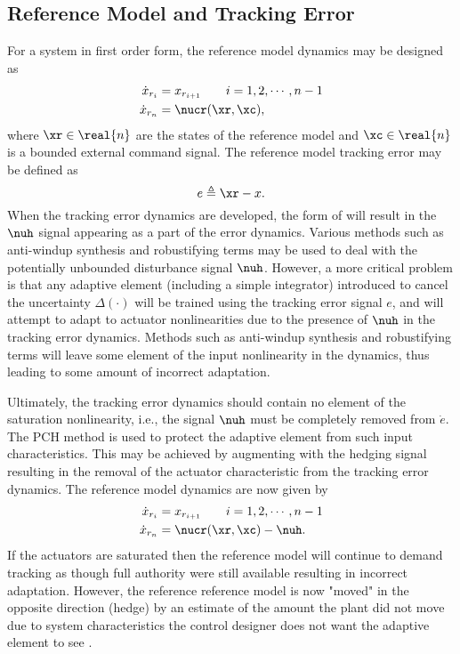 \subsection{Reference Model and Tracking Error} For a system in first order form, the
reference model dynamics may be designed as
\begin{equation}
\begin{split}\label{e:simple:oldrm}
\dot{x}_{r_i} &= x_{r_{i+1}} \qquad i = 1,2,\cdots,n-1\\
\dot{x}_{r_n} &= \nucr(\xr, \xc),
\end{split}
\end{equation}
where $\xr \in \real{n}$ are the states of the reference model and
$\xc \in \real{n}$ is a bounded external command signal. The
reference model tracking error may be defined as
\begin{equation} \label{e:simple:e}
e \triangleq \xr - x.
\end{equation}
When the tracking error dynamics are developed, the form of
 will result in the $\nuh$ signal appearing as a
part of the error dynamics. Various methods such as anti-windup
synthesis \cite{zaccarian:auto:02} and robustifying terms
\cite{khalil92} may be used to deal with the potentially unbounded
disturbance signal $\nuh$. However, a more critical problem is that
any adaptive element (including a simple integrator) introduced to
cancel the uncertainty $\Delta(\cdot)$ will be trained using the
tracking error signal $e$, and  will attempt to adapt to actuator
nonlinearities due to the presence of $\nuh$ in the tracking error
dynamics. Methods such as anti-windup synthesis and robustifying
terms will leave some element of the input nonlinearity in the
dynamics, thus leading to some amount of incorrect adaptation.

Ultimately, the tracking error dynamics should contain no element of
the saturation nonlinearity, i.e., the signal $\nuh$ must be
completely removed from $\dot{e}$. The PCH method
\cite{ejohnson:phd} is used to protect the adaptive element
from such input characteristics. This may be achieved by augmenting
 with the hedging signal resulting in the removal
of the actuator characteristic from the tracking error dynamics. The
reference model dynamics are now given by
\begin{equation}
\label{e:simple:rm}
\begin{split}
\dot{x}_{r_i} &= x_{r_{i+1}} \qquad i = 1,2,\cdots,n-1\\
\dot{x}_{r_n} &= \nucr(\xr, \xc) - \nuh.
\end{split}
\end{equation}
If the actuators are saturated then the reference model will
continue to demand tracking as though full authority were still
available resulting in incorrect adaptation. However, the reference
reference model is now "moved" in the opposite direction (hedge) by
an estimate of the amount the plant did not move due to system
characteristics the control designer does not want the adaptive
element to see \cite{ejohnson:phd}.

